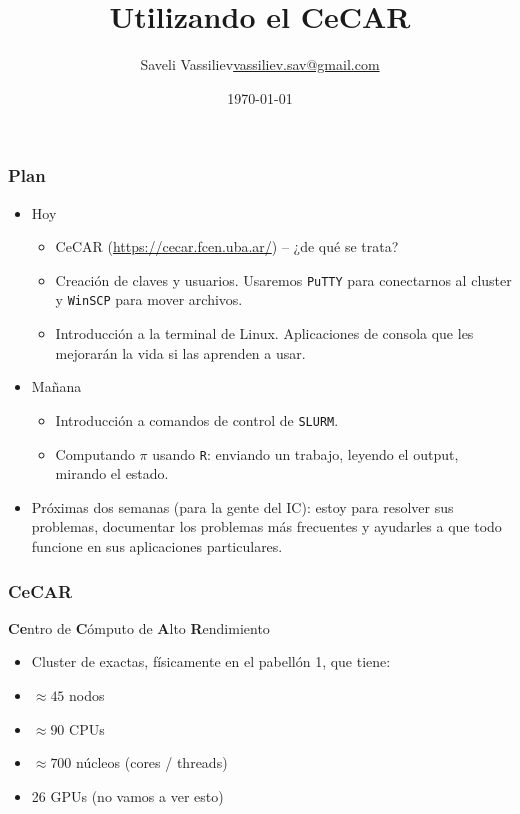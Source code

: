 \documentclass[handout]{beamer}
\title[CeCAR]{Utilizando el CeCAR}
\author{\texorpdfstring{Saveli Vassiliev\newline\url{vassiliev.sav@gmail.com}}{Saveli Vassiliev}}
\institute[UBA, FCEyN, IC]{Universidad de Buenos Aires \\ Facultad de Ciencias Exactas y Naturales, Instituto de Cálculo}
\date{\today}                    %
\begin{document}
\begin{frame}
  \titlepage
\end{frame}

%


\begin{frame}
\frametitle{Plan}
\begin{itemize}
  \item<+-> Hoy
  \begin{itemize}
    \item CeCAR (\url{https://cecar.fcen.uba.ar/}) -- ¿de qué se trata?
    \item Creación de claves y usuarios. Usaremos \Verb=PuTTY= para conectarnos al cluster y \Verb=WinSCP= para mover archivos.
    \item Introducción a la terminal de Linux. Aplicaciones de consola que les mejorarán la vida si las aprenden a usar.
  \end{itemize}
  \item<+-> Mañana
  \begin{itemize}
    \item Introducción a comandos de control de \Verb=SLURM=.
    \item Computando $\pi$ usando \Verb=R=: enviando un trabajo, leyendo el output, mirando el estado.
  \end{itemize}
  \item<+-> Próximas dos semanas (para la gente del IC): estoy para resolver sus problemas, documentar los problemas más frecuentes y ayudarles a que todo funcione en sus aplicaciones particulares.
\end{itemize}
\end{frame}

\begin{frame}
\frametitle{CeCAR}
\textbf{Ce}ntro de \textbf{C}ómputo de \textbf{A}lto \textbf{R}endimiento

\begin{itemize}
  \item Cluster de exactas, físicamente en el pabellón 1, que tiene:
  \item $\approx 45$ nodos
  \item $\approx 90$ CPUs
  \item $\approx 700$ núcleos (cores / threads)
  \item 26 GPUs (no vamos a ver esto)
\end{itemize}
\end{frame}
\end{document}
